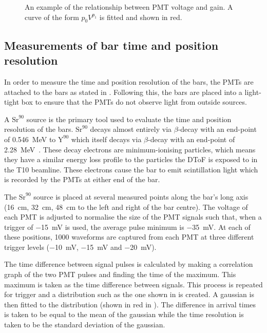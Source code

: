 \begin{figure}[h]
  \centering
  \begin{adjustbox}{max totalsize={.8\textwidth}, center}
    
  \end{adjustbox}
  \caption[Example of relationship between PMT voltage and gain]{An example of the relationship between PMT voltage and gain. A curve of the form $p_{0} V^{p_{1}}$ is fitted and shown in red.}
  \label{fig:gainEx}
\end{figure}

\subsection{Measurements of bar time and position resolution}
\label{sec:hptpc_dtof_characterisation:characterisation:barRes}

In order to measure the time and position resolution of the bars, the PMTs are attached to the bars as stated in .
Following this, the bars are placed into a light-tight box to ensure that the PMTs do not observe light from outside sources.

A $\text{Sr}^{90}$ source is the primary tool used to evaluate the time and position resolution of the bars.
$\text{Sr}^{90}$ decays almost entirely via $\beta$-decay with an end-point of \SI{0.546}{\mega\electronvolt} to $\text{Y}^{90}$ which itself decays via $\beta$-decay with an end-point of \SI{2.28}{\mega\electronvolt}~\cite{strontium}.
These decay electrons are minimum-ionising particles, which means they have a similar energy loss profile to the particles the DToF is exposed to in the T10 beamline.
These electrons cause the bar to emit scintillation light which is recorded by the PMTs at either end of the bar.

The $\text{Sr}^{90}$ source is placed at several measured points along the bar's long axis (\SI{16}{\cm}, \SI{32}{\cm}, \SI{48}{\cm} to the left and right of the bar centre).
The voltage of each PMT is adjusted to normalise the size of the PMT signals such that, when a trigger of \SI{-15}{\milli\volt} is used, the average pulse minimum is \SI{-35}{\milli\volt}.
At each of these positions, 1000 waveforms are captured from each PMT at three different trigger levels (\SI{-10}{\milli\volt}, \SI{-15}{\milli\volt} and \SI{-20}{\milli\volt}).

The time difference between signal pulses is calculated by making a correlation graph of the two PMT pulses and finding the time of the maximum.
This maximum is taken as the time difference between signals.
This process is repeated for trigger and a distribution such as the one shown in  is created.
A gaussian is then fitted to the distribution (shown in red in ).
The difference in arrival times is taken to be equal to the mean of the gaussian while the time resolution is taken to be the standard deviation of the gaussian.

